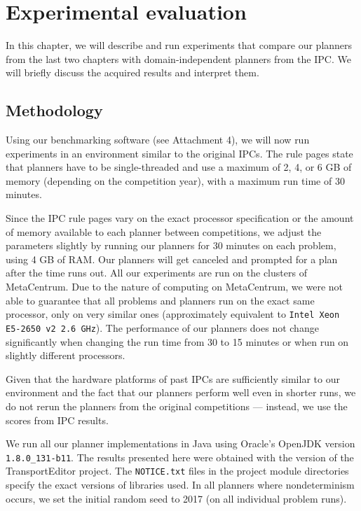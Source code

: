 \chapter{Experimental evaluation}\label{experiments}

In this chapter, we will describe and run experiments
that compare our planners from the last two chapters
with domain-independent planners from the IPC.
We will briefly discuss the acquired results and interpret them.

\section{Methodology}

Using our benchmarking software (see Attachment 4), we will now run experiments in an
environment similar to the original
IPCs. The rule pages state that
planners have to be single-threaded and use a maximum of 2, 4, or 6 GB of memory (depending on the competition year), with a maximum run time of 30 minutes.

Since the IPC rule pages vary on the exact processor specification or the amount of memory available to each planner between competitions,
we adjust the parameters slightly by running our planners
for 30 minutes on each problem, using 4 GB of RAM.
Our planners will get canceled and prompted for a plan after the time runs out. 
All our experiments are run on
the clusters of MetaCentrum.
Due to the nature of computing on MetaCentrum, we were not able to guarantee that all problems and planners
run on the exact same processor, only on very similar ones
(approximately equivalent to \texttt{Intel Xeon E5-2650 v2 2.6 GHz}).
The performance of our planners does not change significantly
when changing the run time from 30 to 15 minutes or when run
on slightly different processors.

Given that the hardware platforms of past IPCs are sufficiently similar
to our environment and the fact that
our planners perform well even in shorter runs,
we do not rerun the planners from the original competitions
--- instead, we use the scores from IPC results.

We run all our planner implementations in Java using Oracle's OpenJDK 
version \texttt{1.8.0\_131-b11}.
The results presented here were obtained with the \TEver{} version of the TransportEditor project. The \texttt{NOTICE.txt} files
in the project module directories specify
the exact versions of libraries used.
In all planners where nondeterminism occurs,
we set the initial random seed to 2017
(on all individual problem runs).

